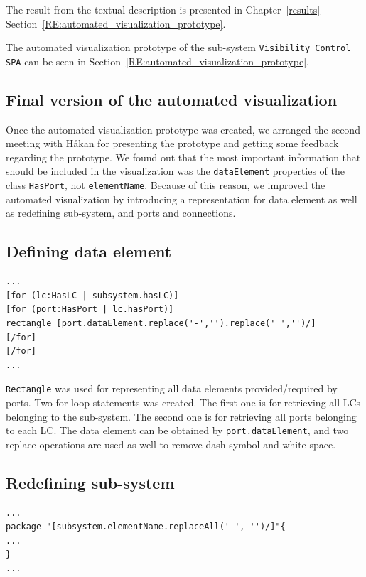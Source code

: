 The result from the textual description is presented in Chapter~\ref{results} Section~\ref{RE:automated_visualization_prototype}.

The automated visualization prototype of the sub-system \texttt{Visibility Control SPA} can be seen in Section~\ref{RE:automated_visualization_prototype}.

\subsection{Final version of the automated visualization}
Once the automated visualization prototype was created, we arranged the second meeting with Håkan for presenting the prototype and getting some feedback regarding the prototype. We found out that the most important information that should be included in the visualization was the \texttt{dataElement} properties of the class \texttt{HasPort}, not \texttt{elementName}. Because of this reason, we improved the automated visualization by introducing a representation for data element as well as redefining sub-system, and ports and connections.

\subsection*{Defining data element}
\begin{lstlisting}[caption=Defining \texttt{rectangle} for the data element,label=code:defining_dataelements]
...
[for (lc:HasLC | subsystem.hasLC)]
[for (port:HasPort | lc.hasPort)]
rectangle [port.dataElement.replace('-','').replace(' ','')/]
[/for]
[/for]
...
\end{lstlisting}

\texttt{Rectangle} was used for representing all data elements provided/required by ports. Two for-loop statements was created. The first one is for retrieving all LCs belonging to the sub-system. The second one is for retrieving all ports belonging to each LC. The data element can be obtained by \texttt{port.dataElement}, and two replace operations are used as well to remove dash symbol and white space.

\subsection*{Redefining sub-system}
\begin{lstlisting}[caption=Redefining \texttt{package} for the sub-system,label=code:redefining_subsystem]
...
package "[subsystem.elementName.replaceAll(' ', '')/]"{
...
}
...
\end{lstlisting}

